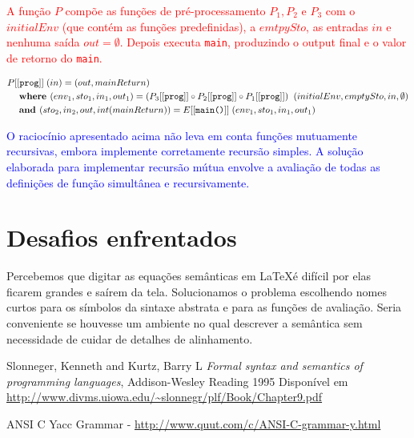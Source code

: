 \documentclass[12pt]{article}
\newcommand{\blu}{\textcolor{blue}}
\newcommand{\red}{\textcolor{red}}
\newcommand\eb[1]{[[\texttt{#1}]]}
\begin{document}
\red{
A função $P$ compõe as funções de pré-processamento $P_1, P_2$ e $P_3$ com o $initialEnv$ (que contém as funções predefinidas), a $emtpySto$, as entradas $in$ e nenhuma saída $out = \emptyset$. Depois executa {\tt main}, produzindo o output final e o valor de retorno do {\tt main}.
}

\red{
\begin{align*}
&P\eb{prog}\; (in) = (out,mainReturn)\\
&\hspace{3ex}\textbf{where }(env_1,sto_1,in_1,out_1) = (P_3\eb{prog} \circ P_2\eb{prog} \circ P_1\eb{prog})\;\;(initialEnv,emptySto,in,\emptyset)\\
&\hspace{3ex}\textbf{and } (sto_2,in_2,out,int(mainReturn)) = E\eb{main()}\;(env_1,sto_1,in_1,out_1)
\end{align*}
}

\blu{O raciocínio apresentado acima não leva em conta funções mutuamente recursivas, embora implemente corretamente recursão simples. A solução elaborada para implementar recursão mútua envolve a avaliação de todas as definições de função simultânea e recursivamente.}

\section{Desafios enfrentados}
Percebemos que digitar as equações semânticas em \LaTeX é difícil por elas ficarem grandes e saírem da tela. Solucionamos o problema escolhendo nomes curtos para os símbolos da sintaxe abstrata e para as funções de avaliação. Seria conveniente se houvesse um ambiente no qual descrever a semântica sem necessidade de cuidar de detalhes de alinhamento. 

\begin{thebibliography}{9}
  Slonneger, Kenneth and Kurtz, Barry L
  \textit{Formal syntax and semantics of programming languages},
  Addison-Wesley Reading
  1995
  Disponível em \url{http://www.divms.uiowa.edu/~slonnegr/plf/Book/Chapter9.pdf}

\item ANSI C Yacc Grammar - \url{http://www.quut.com/c/ANSI-C-grammar-y.html}
\end{thebibliography}
	
\end{document}
